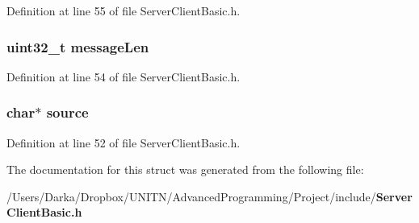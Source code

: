 Definition at line 55 of file Server\+Client\+Basic.\+h.

\subsubsection[{message\+Len}]{\setlength{\rightskip}{0pt plus 5cm}uint32\+\_\+t message\+Len}\label{structpacket__basic_ade4abab55eb9abc7f0143dd1c4de545f}


Definition at line 54 of file Server\+Client\+Basic.\+h.

\subsubsection[{source}]{\setlength{\rightskip}{0pt plus 5cm}char$\ast$ source}\label{structpacket__basic_aee6937c81d468a0915308234d09d212c}


Definition at line 52 of file Server\+Client\+Basic.\+h.



The documentation for this struct was generated from the following file\+:\begin{DoxyCompactItemize}
\item 
/\+Users/\+Darka/\+Dropbox/\+U\+N\+I\+T\+N/\+Advanced\+Programming/\+Project/include/{\bf Server\+Client\+Basic.\+h}\end{DoxyCompactItemize}
